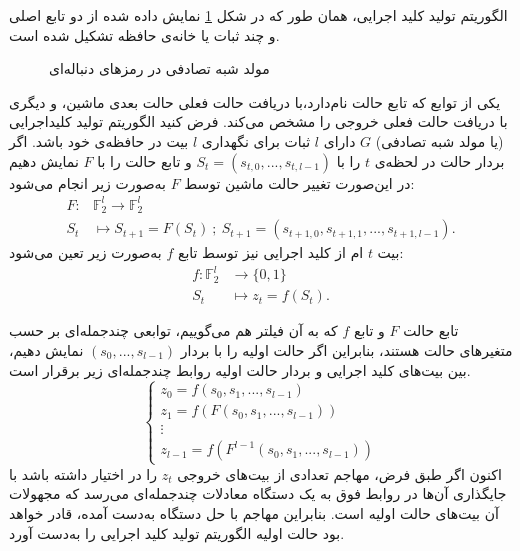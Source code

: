 الگوریتم تولید کلید اجرایی، همان طور که در شکل 
\ref{fig:prg}
نمایش داده شده از دو تابع اصلی و چند ثبات یا خانه‌ی حافظه تشکیل شده است. 
\begin{figure}
\begin{center}

\caption{مولد شبه تصادفی در رمزهای دنباله‌ای}
\label{fig:prg}
\end{center}
\end{figure}
یکی از توابع که تابع حالت نام‌دارد،با دریافت حالت فعلی حالت بعدی ماشین، و دیگری با دریافت حالت فعلی خروجی را مشخص می‌کند.  فرض کنید الگوریتم تولید کلیداجرایی (یا مولد شبه تصادفی)
$G$
دارای 
$l$
ثبات برای نگهداری 
$l$
بیت در حافظه‌ی خود باشد. اگر بردار حالت در لحظه‌ی 
$t$
را با 
{\small $S_{t} = (s_{t,0},...,s_{t,l-1})$}
و تابع حالت را با 
$F$
نمایش دهیم در این‌صورت تغییر حالت ماشین توسط 
$F$
به‌صورت زیر انجام می‌شود:
\begin{align*}
F:&\mathbb{F}_{2}^{l}\rightarrow \mathbb{F}_{2}^{l}\\
S_{t}&\mapsto S_{t+1} = F(S_{t}) \ ; \ S_{t+1} = (s_{t+1,0},s_{t+1,1},...,s_{t+1,l-1}).
\end{align*}
بیت 
$t$
ام از کلید اجرایی نیز توسط تابع 
$f$
به‌صورت زیر تعین می‌شود:
\begin{align*}
f:\mathbb{F}_{2}^{l}&\rightarrow \{0,1\}\\
S_{t}&\mapsto z_{t} = f(S_{t}).
\end{align*}


تابع حالت 
$F$
و تابع 
$f$
که به آن فیلتر هم می‌گوییم، توابعی چندجمله‌ای بر حسب متغیرهای حالت هستند، بنابراین اگر حالت اولیه را با بردار 
$(s_{0},...,s_{l-1})$
نمایش دهیم، بین بیت‌های کلید اجرایی و بردار حالت اولیه روابط چندجمله‌ای  زیر برقرار است.
$$\left \{ \begin{array}{l}
z_{0} = f(s_{0},s_{1},...,s_{l-1})\\
z_{1} = f(F(s_{0},s_{1},...,s_{l-1}))\\
\vdots \\
z_{l-1} = f(F^{l-1}(s_{0},s_{1},...,s_{l-1}))
\end{array} \right.$$
اکنون اگر طبق فرض، مهاجم تعدادی از بیت‌های خروجی 
$z_{t}$
را در اختیار داشته باشد با جایگذاری آن‌ها در روابط فوق به یک دستگاه معادلات چندجمله‌ای می‌رسد که مجهولات آن بیت‌های حالت اولیه است.  بنابراین  مهاجم با حل دستگاه به‌دست آمده، قادر خواهد بود حالت اولیه  الگوریتم تولید کلید اجرایی را به‌دست آورد. 

